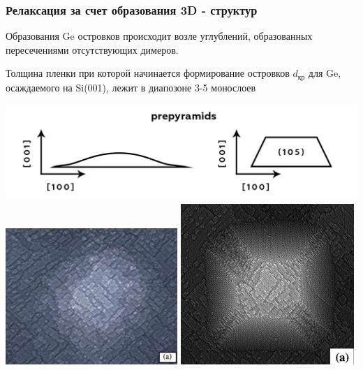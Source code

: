 \documentclass[10pt,pdf,hyperref={unicode}, dvipsnames]{beamer}
\begin{document}
\begin{frame}[t]
	\frametitle{Релаксация за счет образования 3D - структур}
	Образования Ge островков происходит возле углублений, образованных пересечениями отсутствующих димеров.

	Толщина пленки при которой начинается формирование островков $d_{\text{кр}}$ для Ge, осаждаемого на Si(001), лежит в
	диапозоне 3-5 монослоев
	
	\centering
	\includegraphics[width = 0.99\linewidth]{imgs/Pre.png}
	\includegraphics[width = .35\linewidth]{imgs/prepyra.jpg}
	\includegraphics[width = .3\linewidth]{imgs/pyra.jpg}


\end{frame}
\end{document}

